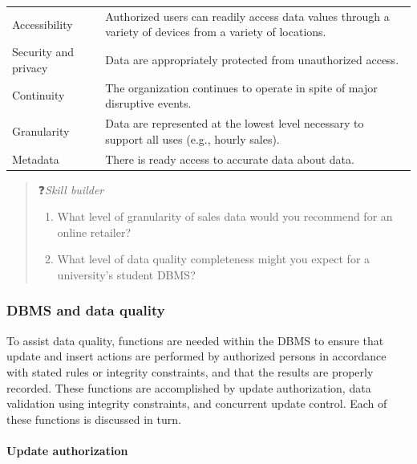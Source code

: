 \documentclass[
]{article}
\begin{document}
\begin{longtable}[]{@{}
  >{\raggedright\arraybackslash}p{}
  >{\raggedright\arraybackslash}p{}@{}}
Accessibility & Authorized users can readily access data values through a variety of devices from a variety of locations. \\
Security and privacy & Data are appropriately protected from unauthorized access. \\
Continuity & The organization continues to operate in spite of major disruptive events. \\
Granularity & Data are represented at the lowest level necessary to support all uses (e.g., hourly sales). \\
Metadata & There is ready access to accurate data about data. \\
\bottomrule
\end{longtable}

\begin{quote}
❓\emph{Skill builder}

\begin{enumerate}
\def\labelenumi{\arabic{enumi}.}
\item
  What level of granularity of sales data would you recommend for an
  online retailer?
\item
  What level of data quality completeness might you expect for a
  university's student DBMS?
\end{enumerate}
\end{quote}

\hypertarget{dbms-and-data-quality}{%
\subsubsection*{DBMS and data quality}\label{dbms-and-data-quality}}

To assist data quality, functions are needed within the DBMS to ensure
that update and insert actions are performed by authorized persons in
accordance with stated rules or integrity constraints, and that the
results are properly recorded. These functions are accomplished by
update authorization, data validation using integrity constraints, and
concurrent update control. Each of these functions is discussed in turn.

\hypertarget{update-authorization}{%
\paragraph*{Update authorization}\label{update-authorization}}
\end{document}
